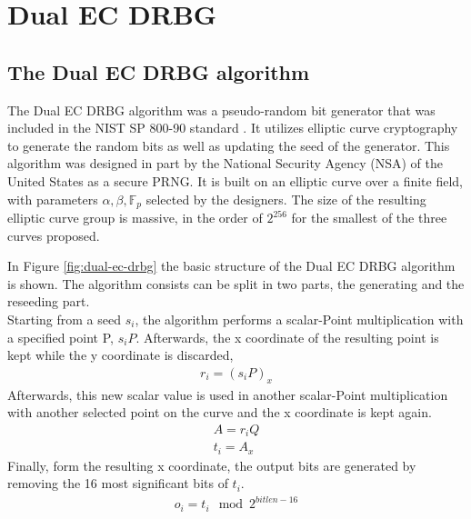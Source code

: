 \section{Dual EC DRBG}

\subsection{The Dual EC DRBG algorithm}

The Dual EC DRBG algorithm was a pseudo-random bit generator that was included in the NIST SP 800-90 standard \cite{nist-sp800-90}. It utilizes elliptic curve cryptography to generate the random bits as well as updating the seed of the generator. This algorithm was designed in part by the National Security Agency (NSA) of the United States as a secure PRNG. It is built on an elliptic curve over a finite field, with parameters $\alpha, \beta, \mathbb{F}_p$ selected by the designers. The size of the resulting elliptic curve group is massive, in the order of $2^{256}$ for the smallest of the three curves proposed.
\\


In Figure \ref{fig:dual-ec-drbg} the basic structure of the Dual EC DRBG algorithm is shown. The algorithm consists can be split in two parts, the generating and the reseeding part. 
\\

Starting from a seed $s_i$, the algorithm performs a scalar-Point multiplication with a specified point P, $s_iP$. Afterwards, the x coordinate of the resulting point is kept while the y coordinate is discarded, 
\begin{gather}
    r_i = {(s_iP)}_x    
\end{gather}
Afterwards, this new scalar value is used in another scalar-Point multiplication with another selected point on the curve and the x coordinate is kept again.
\begin{gather}
    A = r_iQ \\
    t_i = A_{x}
\end{gather}
Finally, form the resulting x coordinate, the output bits are generated by removing the 16 most significant bits of $t_i$.
\begin{gather}
    o_i = t_i \mod 2^{bitlen - 16}
\end{gather}
\\

